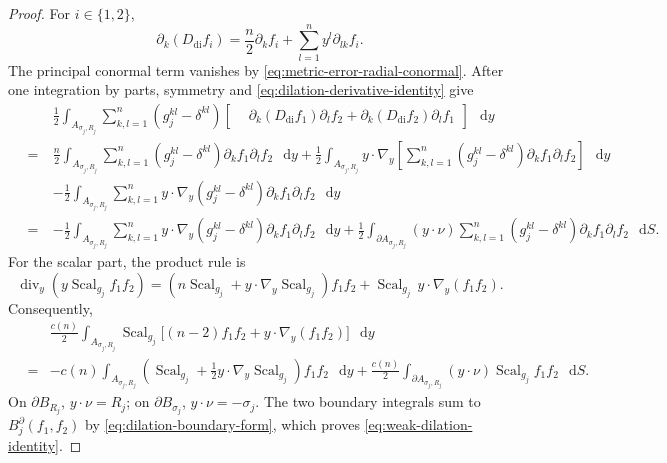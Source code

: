 \documentclass[11pt]{article}
\numberwithin{equation}{section}
\theoremstyle{remark}
\newcommand{\dd}{\mathop{}\!\mathrm{d}}
\begin{document}
\par
\begin{proof}
For \(i\in\{1,2\}\),
\begin{equation}\label{eq:dilation-derivative-identity}
\partial_k(D_{\mathrm{di}}f_i)
=\frac n2\partial_kf_i+\sum_{l=1}^ny^l\partial_{lk}f_i.
\end{equation}
The principal conormal term vanishes by
\eqref{eq:metric-error-radial-conormal}.
After one integration by parts, symmetry and
\eqref{eq:dilation-derivative-identity} give
\[
 \begin{aligned}
 &\frac12\int_{A_{\sigma_j,R_j}}
 \sum_{k,l=1}^n(g_j^{kl}-\delta^{kl})
 \left[
 \begin{aligned}
&\partial_k\left(D_{\mathrm{di}}f_1\right)\partial_lf_2+\partial_k\left(D_{\mathrm{di}}f_2\right)\partial_lf_1
 \end{aligned}
 \right]\,\dd y\\
 \quad=&\frac n2\int_{A_{\sigma_j,R_j}}
 \sum_{k,l=1}^n(g_j^{kl}-\delta^{kl})\partial_kf_1\partial_lf_2\,\dd y
+\frac12\int_{A_{\sigma_j,R_j}}
 y\cdot\nabla_y\left[
 \sum_{k,l=1}^n(g_j^{kl}-\delta^{kl})\partial_kf_1\partial_lf_2
 \right]\,\dd y\\
 \qquad&-\frac12\int_{A_{\sigma_j,R_j}}
 \sum_{k,l=1}^n y\cdot\nabla_y(g_j^{kl}-\delta^{kl})
 \partial_kf_1\partial_lf_2\,\dd y\\
 \quad=&-\frac12\int_{A_{\sigma_j,R_j}}
 \sum_{k,l=1}^n y\cdot\nabla_y(g_j^{kl}-\delta^{kl})
 \partial_kf_1\partial_lf_2\,\dd y+\frac12\int_{\partial A_{\sigma_j,R_j}}
 (y\cdot\nu)\sum_{k,l=1}^n
 (g_j^{kl}-\delta^{kl})\partial_kf_1\partial_lf_2\,\dd S.
 \end{aligned}
\]
For the scalar part, the product rule is
\[
 \operatorname{div}_y(y\operatorname{Scal}_{g_j}f_1f_2)
 =(n\operatorname{Scal}_{g_j}+y\cdot\nabla_y\operatorname{Scal}_{g_j})f_1f_2
 +\operatorname{Scal}_{g_j}\,y\cdot\nabla_y(f_1f_2).
\]
Consequently,
\[
 \begin{aligned}
 &\frac{c(n)}2\int_{A_{\sigma_j,R_j}}\operatorname{Scal}_{g_j}
 \bigl[(n-2)f_1f_2+y\cdot\nabla_y(f_1f_2)\bigr]\,\dd y\\
 \quad=&-c(n)\int_{A_{\sigma_j,R_j}}
\left(\operatorname{Scal}_{g_j}+\frac12y\cdot\nabla_y\operatorname{Scal}_{g_j}\right)f_1f_2\,\dd y+\frac{c(n)}2\int_{\partial A_{\sigma_j,R_j}}
 (y\cdot\nu)\operatorname{Scal}_{g_j}f_1f_2\,\dd S.
 \end{aligned}
\]
On \(\partial B_{R_j}\), \(y\cdot\nu=R_j\); on
\(\partial B_{\sigma_j}\), \(y\cdot\nu=-\sigma_j\).
The two boundary integrals sum to
 \( B_j^\partial(f_1,f_2)\) by \eqref{eq:dilation-boundary-form},
which proves \eqref{eq:weak-dilation-identity}.
\end{proof}
\end{document}
